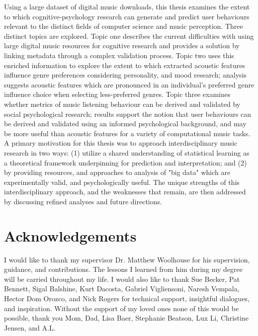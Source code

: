 \documentclass[a4paper]{article}
\begin{document}
Using a large dataset of digital music downloads, this thesis examines the extent to which cognitive-psychology research can generate and predict user behaviours relevant to the distinct fields of computer science and music perception. Three distinct topics are explored. Topic one describes the current difficulties with using large digital music resources for cognitive research and provides a solution by linking metadata through a complex validation process. Topic two uses this enriched information to explore the extent to which extracted acoustic features influence genre preferences considering personality, and mood research; analysis suggests acoustic features which are pronounced in an individual's preferred genre influence choice when selecting less-preferred genres. Topic three examines whether metrics of music listening behaviour can be derived and validated by social psychological research; results support the notion that user behaviours can be derived and validated using an informed psychological background, and may be more useful than acoustic features for a variety of computational music tasks. A primary motivation for this thesis was to approach interdisciplinary music research in two ways: (1) utilize a shared understanding of statistical learning as a theoretical framework underpinning for prediction and interpretation; and (2) by providing resources, and approaches to analysis of "big data" which are experimentally valid, and psychologically useful. The unique strengths of this interdisciplinary approach, and the weaknesses that remain, are then addressed by discussing refined analyses and future directions.

\vspace*{\fill}

\newpage
\vspace*{\fill}
\section*{Acknowledgements}
I would like to thank my supervisor Dr. Matthew Woolhouse for his supervision, guidance, and contributions. The lessons I learned from him during my degree will be carried throughout my life. I would also like to thank Sue Becker, Pat Bennett, Sigal Balshine, Kurt Dacosta, Gabriel Vigliensoni, Naresh Vempala, Hector Dom Orozco, and Nick Rogers for technical support, insightful dialogues, and inspiration. Without the support of my loved ones none of this would be possible, thank you Mom, Dad, Lisa Baer, Stephanie Beatson, Lux Li, Christine Jensen, and A.L.
\vspace*{\fill}
\end{document}
